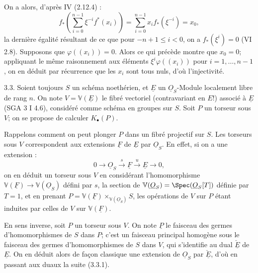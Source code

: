 
On a alors, d'après IV (2.12.4) :
\[
f_*\left(\sum_{i=0}^{n-1}\xi^{-i}f^*(x_i)\right)
=\sum_{i=0}^{n-1}x_i f_*(\xi^{-i})=x_0,
\]
la dernière égalité résultant de ce que pour $-n+1\le i<0$, on a $f_*(\xi^i)=0$ (VI 2.8). Supposons que $\varphi((x_i))=0$. Alors ce qui précède montre que $x_0=0$; appliquant le même raisonnement aux éléments $\xi^i\varphi((x_i))$ pour $i=1,\ldots,n-1$, on en déduit par récurrence que les $x_i$ sont tous nuls, d'où l'injectivité.

3.3. Soient toujours $S$ un schéma noethérien, et $\underline{E}$ un $\underline{O}_S$-Module localement libre de rang $n$. On note $V=\mathbb V(\underline{E})$ le fibré vectoriel (contravariant en $E$!) associé à $\underline{E}$ (SGA 3 I 4.6), considéré comme schéma en groupes sur $S$. Soit $P$ un torseur sous $V$; on se propose de calculer $K_\bullet(P)$.

Rappelons comment on peut plonger $P$ dans un fibré projectif sur $S$. Les torseurs sous $V$ correspondent aux extensions $\underline{F}$ de $\underline{E}$ par $\underline{O}_S$. En effet, si on a une extension :
\[
0\longrightarrow \underline{O}_S\xrightarrow{s}\underline{F}\xrightarrow{u}\underline{E}\longrightarrow 0,
\tag{3.3.1}
\]
on en déduit un torseur sous $V$ en considérant l'homomorphisme $\mathbb V(\underline{F})\to \mathbb V(\underline{O}_S)$ défini par $s$, la section de $\mathbb V(\underline{O}_S)=\Spec(\underline{O}_S[T])$ définie par $T=1$, et en prenant $P=\mathbb V(\underline{F})\times_{\mathbb V(\underline{O}_S)}S$, les opérations de $V$ sur $P$ étant induites par celles de $V$ sur $\mathbb V(\underline{F})$.

En sens inverse, soit $P$ un torseur sous $V$. On note $\underline P$ le faisceau des germes d'homomorphismes de $S$ dans $P$; c'est un faisceau principal homogène sous le faisceau des germes d'homomorphismes de $S$ dans $V$, qui s'identifie au dual $\check{\underline{E}}$ de $\underline{E}$. On en déduit alors de façon classique une extension de $\underline{O}_S$ par $\check{\underline{E}}$, d'où en passant aux duaux la suite (3.3.1).

